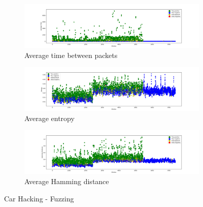 \begin{figure}
    \centering
    \begin{subfigure}[b]{\linewidth}
        \includegraphics[width = \linewidth]{img/parts/app/tests/car_hacking/fuzzy/AvgTime.png}
        \caption{Average time between packets}
        \label{subfig:extract_carhacking_fuzzy_avgtime}
    \end{subfigure}
    \begin{subfigure}[b]{\linewidth}
        \includegraphics[width = \linewidth]{img/parts/app/tests/car_hacking/fuzzy/Entropy.png}
        \caption{Average entropy}
        \label{subfig:extract_carhacking_fuzzy_entropy}
    \end{subfigure}
    \begin{subfigure}[b]{\linewidth}
        \includegraphics[width = \linewidth]{img/parts/app/tests/car_hacking/fuzzy/HammingDist.png}
        \caption{Average Hamming distance}
        \label{subfig:extract_carhacking_fuzzy_hammingdist}
    \end{subfigure}
    \caption{Car Hacking - Fuzzing}
    \label{fig:extract_carhacking_fuzzy}
\end{figure}


